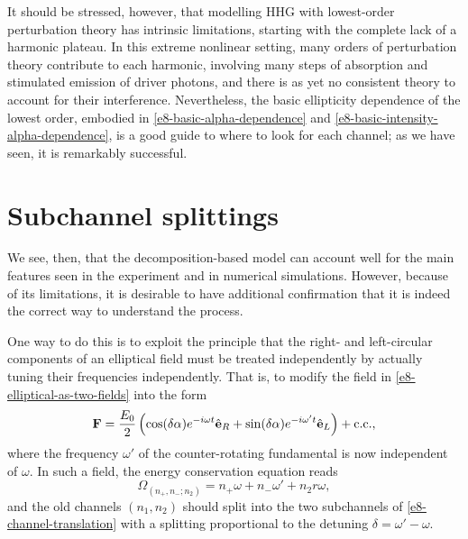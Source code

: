 It should be stressed, however, that modelling HHG with lowest-order perturbation theory has intrinsic limitations, starting with the complete lack of a harmonic plateau. In this extreme nonlinear setting, many orders of perturbation theory contribute to each harmonic, involving many steps of absorption and stimulated emission of driver photons, and there is as yet no consistent theory to account for their interference. Nevertheless, the basic ellipticity dependence of the lowest order, embodied in \eqref{e8-basic-alpha-dependence} and \eqref{e8-basic-intensity-alpha-dependence}, is a good guide to where to look for each channel; as we have seen, it is remarkably successful.














\section{Subchannel splittings}
\label{sec:subchannel-splittings}
We see, then, that the decomposition-based model can account well for the main features seen in the experiment and in numerical simulations. However, because of its limitations, it is desirable to have additional confirmation that it is indeed the correct way to understand the process.

One way to do this is to exploit the principle that the right- and left-circular components of an elliptical field must be treated independently by actually tuning their frequencies independently. That is, to modify the field in \eqref{e8-elliptical-as-two-fields} into the form
\begin{equation}
 \vb{F}=
 \frac{E_0}{2}
 \left(
 \cos(\delta\alpha)e^{-i\omega t}\hat{\vb{e}}_R
 +
  \sin(\delta\alpha)e^{-i\omega' t}\hat{\vb{e}}_L
 \right)
 +\mathrm{c.c.},
 \label{e8-detuned-elliptical-field}
\end{equation}
where the frequency $\omega'$ of the counter-rotating fundamental is now independent of $\omega$. In such a field, the energy conservation equation reads
\begin{equation}
 \Omega_{(n_+,n_-;n_2)}=n_+\omega + n_-\omega'+n_2r\omega,
 \label{e8-modified-energy-conservation}
\end{equation}
and the old channels $(n_1,n_2)$ should split into the two subchannels of \eqref{e8-channel-translation} with a splitting proportional to the detuning $\delta=\omega'-\omega$.









